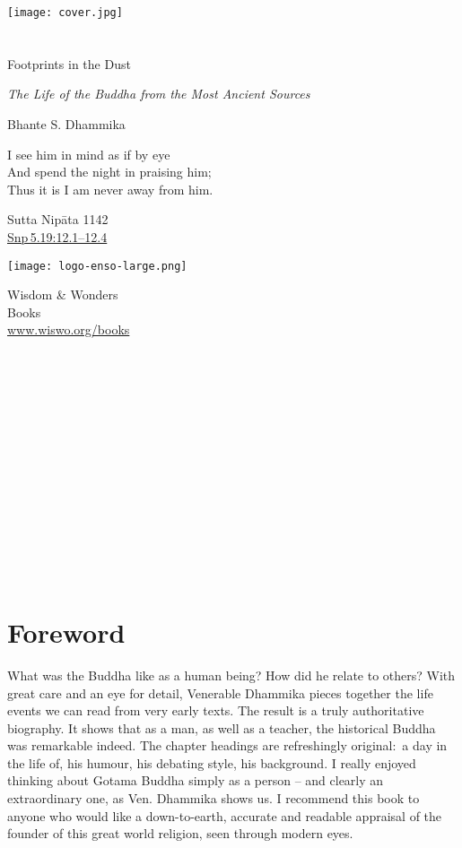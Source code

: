 \texttt{[image: cover.jpg]}

\label{titlepage.xhtml}{}

\label{footprints_split_000.html}{}

\section{}\label{footprints_split_000.html_TOCTarget0-1}

Footprints in the Dust

\emph{The Life of the Buddha from the Most Ancient Sources}

Bhante S. Dhammika

I see him in mind as if by eye\\
And spend the night in praising him;\\
Thus it is I am never away from him.

Sutta Nipāta 1142\\
\href{https://suttacentral.net/snp5.19/en/sujato\#12.1}{Snp\,5.19:12.1--12.4}

\texttt{[image: logo-enso-large.png]}

Wisdom \& Wonders\\
Books\\
\href{https://wiswo.org/books}{www.wiswo.org/books}

~

~

~

~

~

~

~

~

\label{footprints_split_000.html_calibre_pb_1}

\label{footprints_split_001.html}{}

\section{Foreword}\label{footprints_split_001.html_TOCTarget0-2}

What was the Buddha like as a human being? How did he relate to others?
With great care and an eye for detail, Venerable Dhammika pieces
together the life events we can \textquotesingle read\textquotesingle{}
from very early texts. The result is a truly authoritative biography. It
shows that as a man, as well as a teacher, the historical Buddha was
remarkable indeed. The chapter headings are refreshingly original:~a day
in the life of, his humour, his debating style, his background. I really
enjoyed thinking about Gotama Buddha simply as a person -- and clearly
an extraordinary one, as Ven. Dhammika shows us. I recommend this book
to anyone who would like a down-to-earth, accurate and readable
appraisal of the founder of this great world religion, seen through
modern eyes.

